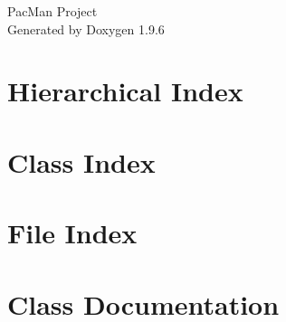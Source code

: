 \documentclass[twoside]{book}
\newcommand{\+}{\discretionary{\mbox{\scriptsize$\hookleftarrow$}}{}{}}
\newcommand{\clearemptydoublepage}{%
    \newpage{\pagestyle{empty}\cleardoublepage}%
  }
\begin{document}
  \raggedbottom
  \begin{titlepage}
  \vspace*{7cm}
  \begin{center}%
  {\Large Pac\+Man Project}\\
  \vspace*{1cm}
  {\large Generated by Doxygen 1.9.6}\\
  \end{center}
  \end{titlepage}
  \clearemptydoublepage
  \tableofcontents
  \clearemptydoublepage
\chapter{Hierarchical Index}

\chapter{Class Index}

\chapter{File Index}

\chapter{Class Documentation}




























\end{document}
